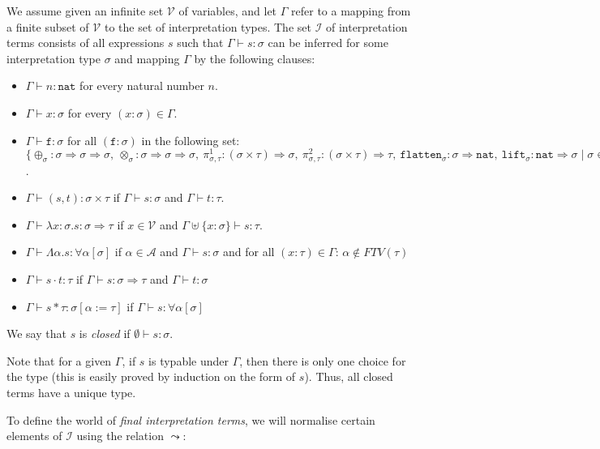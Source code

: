 \documentclass[runningheads,a4paper]{llncs}
\newcommand{\Iterms}{\mathcal{I}}
\newcommand{\Typevars}{\mathcal{A}}
\newcommand{\Vars}{\mathcal{V}}
\newcommand{\ITypes}{\mathcal{Y}}
\newcommand{\quant}[2]{\forall #1[#2]}
\newcommand{\arrtype}{\Rightarrow}
\newcommand{\abs}[2]{\lambda #1.#2}
\newcommand{\tabs}[2]{\Lambda #1.#2}
\newcommand{\app}[2]{#1 \cdot #2}
\newcommand{\tapp}[2]{#1 * #2}
\newcommand{\subst}[2]{#1:=#2}
\newcommand{\FTV}{\mathit{FTV}}
\newcommand{\nat}{\mathtt{nat}}
\newcommand{\proj}{\pi}
\newcommand{\flatten}{\mathtt{flatten}}
\newcommand{\lift}{\mathtt{lift}}
\begin{document}
\begin{definition}\label{def_typing}
We assume given an infinite set $\Vars$ of variables, and let $\Gamma$
refer to a mapping from a finite subset of $\Vars$ to the set of
interpretation types.  The set $\Iterms$ of interpretation terms consists
of all expressions $s$ such that $\Gamma \vdash s : \sigma$ can be
inferred for some interpretation type $\sigma$ and mapping $\Gamma$ by
the following clauses:
\begin{itemize}
\item $\Gamma \vdash n : \nat$ for every natural number $n$.
\item $\Gamma \vdash x : \sigma$ for every $(x : \sigma) \in \Gamma$.
\item $\Gamma \vdash \mathtt{f} : \sigma$ for all $(\mathtt{f} :
  \sigma)$ in the following set: $\{ \oplus_\sigma : \sigma \arrtype
  \sigma \arrtype \sigma,\ \otimes_\sigma : \sigma \arrtype \sigma \arrtype
  \sigma,\ \proj^1_{\sigma,\tau} : (\sigma \times \tau) \arrtype
  \sigma,\ \proj^2_{\sigma,\tau} : (\sigma \times \tau) \arrtype \tau,\ 
  \flatten_{\sigma} : \sigma \arrtype \nat,\ 
  \lift_{\sigma} : \nat \arrtype \sigma
  \mid \sigma \in \ITypes \}$.
\item $\Gamma \vdash (s,t) : \sigma \times \tau$ if $\Gamma \vdash s :
  \sigma$ and $\Gamma \vdash t : \tau$.
\item $\Gamma \vdash \abs{x:\sigma}{s} : \sigma \arrtype \tau$ if $x
  \in \Vars$ and $\Gamma \uplus \{ x : \sigma \} \vdash s : \tau$.
\item $\Gamma \vdash \tabs{\alpha}{s} : \quant{\alpha}{\sigma}$ if
  $\alpha \in \Typevars$ and $\Gamma \vdash s : \sigma$ and for all
  $(x : \tau) \in \Gamma$: $\alpha \notin \FTV(\tau)$
\item $\Gamma \vdash \app{s}{t} : \tau$ if $\Gamma \vdash s :
  \sigma \arrtype \tau$ and $\Gamma \vdash t : \sigma$
\item $\Gamma \vdash \tapp{s}{\tau} : \sigma[\subst{\alpha}{\tau}]$ if
  $\Gamma \vdash s : \quant{\alpha}{\sigma}$
\end{itemize}
We say that $s$ is \emph{closed} if $\emptyset \vdash s : \sigma$.
\end{definition}

Note that for a given $\Gamma$, if $s$ is typable under $\Gamma$, then
there is only one choice for the type (this is easily proved by
induction on the form of $s$). Thus, all closed terms have a unique
type.

\medskip
To define the world of \emph{final interpretation terms}, we will
normalise certain elements of $\Iterms$ using the relation $\leadsto$:
\end{document}
